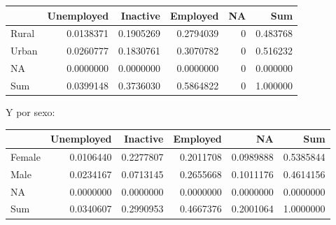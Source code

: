 \documentclass[
  12pt,
]{book}
\newenvironment{Shaded}{\begin{snugshade}}{\end{snugshade}}
\newcommand{\AttributeTok}[1]{\textcolor[rgb]{0.13,0.29,0.53}{#1}}
\newcommand{\FunctionTok}[1]{\textcolor[rgb]{0.13,0.29,0.53}{\textbf{#1}}}
\newcommand{\NormalTok}[1]{#1}
\newcommand{\SpecialCharTok}[1]{\textcolor[rgb]{0.81,0.36,0.00}{\textbf{#1}}}
\newcommand{\StringTok}[1]{\textcolor[rgb]{0.31,0.60,0.02}{#1}}
\begin{document}
\begin{tabular}{l|r|r|r|r|r}
\hline
  & Unemployed & Inactive & Employed & NA & Sum\\
\hline
Rural & 0.0138371 & 0.1905269 & 0.2794039 & 0 & 0.483768\\
\hline
Urban & 0.0260777 & 0.1830761 & 0.3070782 & 0 & 0.516232\\
\hline
NA & 0.0000000 & 0.0000000 & 0.0000000 & 0 & 0.000000\\
\hline
Sum & 0.0399148 & 0.3736030 & 0.5864822 & 0 & 1.000000\\
\hline
\end{tabular}

Y por sexo:

\begin{Shaded}
\end{Shaded}

\begin{tabular}{l|r|r|r|r|r}
\hline
  & Unemployed & Inactive & Employed & NA & Sum\\
\hline
Female & 0.0106440 & 0.2277807 & 0.2011708 & 0.0989888 & 0.5385844\\
\hline
Male & 0.0234167 & 0.0713145 & 0.2655668 & 0.1011176 & 0.4614156\\
\hline
NA & 0.0000000 & 0.0000000 & 0.0000000 & 0.0000000 & 0.0000000\\
\hline
Sum & 0.0340607 & 0.2990953 & 0.4667376 & 0.2001064 & 1.0000000\\
\hline
\end{tabular}

\begin{Shaded}
\end{Shaded}
\end{document}
